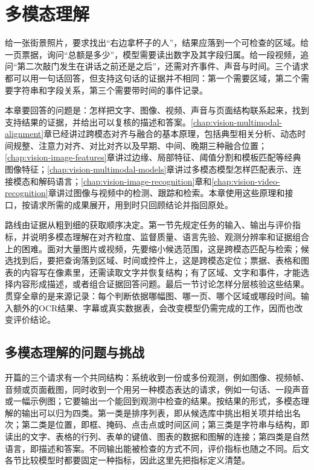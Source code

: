 \chapter{多模态理解}
\label{chap:vision-multimodal-understanding}

给一张街景照片，要求找出“右边拿杯子的人”，结果应落到一个可检查的区域。给一页票据，询问“总额是多少”，模型需要读出数字及其字段归属。给一段视频，追问“第二次敲门发生在讲话之前还是之后”，还需对齐事件、声音与时间。三个请求都可以用一句话回答，但支持这句话的证据并不相同：第一个需要区域，第二个需要字符串和字段关系，第三个需要带时间的事件记录。

本章要回答的问题是：怎样把文字、图像、视频、声音与页面结构联系起来，找到支持结果的证据，并给出可以复核的描述和答案。\ref{chap:vision-multimodal-alignment}章已经讲过跨模态对齐与融合的基本原理，包括典型相关分析、动态时间规整、注意力对齐、对比对齐以及早期、中间、晚期三种融合位置；\ref{chap:vision-image-features}章讲过边缘、局部特征、阈值分割和模板匹配等经典图像特征；\ref{chap:vision-multimodal-models}章讲过多模态模型怎样匹配表示、连接模态和解码语言；\ref{chap:vision-image-recognition}章和\ref{chap:vision-video-recognition}章讲过图像与视频中的检测、跟踪和检索。本章使用这些原理和接口，按请求所需的成果展开，用到时只回顾结论并指回原处。

路线由证据从粗到细的获取顺序决定。第一节先规定任务的输入、输出与评价指标，并说明多模态理解在对齐粒度、监督质量、语言先验、观测分辨率和证据组合上的困难。面对大量图片或视频，先要缩小候选范围，这是跨模态匹配与检索；候选找到后，要把查询落到区域、时间或控件上，这是跨模态定位；票据、表格和图表的内容写在像素里，还需读取文字并恢复结构；有了区域、文字和事件，才能选择内容形成描述，或者组合证据回答问题。最后一节讨论怎样分层核验这些结果。贯穿全章的是来源记录：每个判断依据哪幅图、哪一页、哪个区域或哪段时间。输入额外的OCR结果、字幕或真实数据表，会改变模型仍需完成的工作，因而也改变评价结论。

\section{多模态理解的问题与挑战}
\label{sec:vision-understanding-challenges}

开篇的三个请求有一个共同结构：系统收到一份或多份观测，例如图像、视频帧、音频或页面截图，同时收到一个用另一种模态表达的请求，例如一句话、一段声音或一幅示例图；它要输出一个能回到观测中检查的结果。按结果的形式，多模态理解的输出可以归为四类。第一类是排序列表，即从候选库中挑出相关项并给出名次；第二类是位置，即框、掩码、点击点或时间区间；第三类是字符串与结构，即读出的文字、表格的行列、表单的键值、图表的数据和图解的连接；第四类是自然语言，即描述和答案。不同输出能被检查的方式不同，评价指标也随之不同。后文各节比较模型时都要固定一种指标，因此这里先把指标定义清楚。

